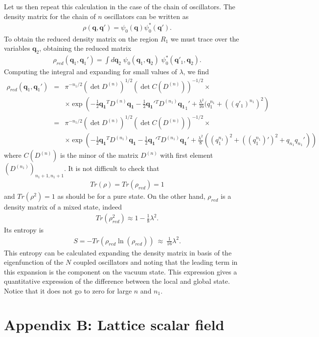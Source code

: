 \documentclass[11pt, nofootinbib]{revtex4-2}
\newcommand{\bea}{\begin{eqnarray}}
\newcommand{\eea}{\end{eqnarray}}
\begin{document}
Let us then repeat this calculation in the case of the chain of
oscillators.  The density matrix for the chain of $n$ oscillators can
be written as
%
\bea
\rho(\mathbf q, \mathbf q') = \psi_0(\mathbf q) 
\psi^*_0( \mathbf q').
\eea
%
To obtain the reduced density matrix on the region $R_{1}$ we must
trace over the variables $\mathbf q_2$, obtaining the reduced
matrix
%
\bea
{\rho}_{red}(\mathbf q_1,\mathbf q_{1}') = \int 
d\mathbf q_2\;{\psi}_0(\mathbf q_1,\mathbf q_2) 
\;{\psi}^*_0(\mathbf q'_1,\mathbf q_2). 
\eea
%
Computing the integral and expanding for small values of $\lambda$, 
we find
%
\bea
{\rho}_{red}(\mathbf q_1,\mathbf q_{1}') &=& \pi^{-n_{1}/2} \left( \det 
D^{\scriptscriptstyle{(n)}}\right)^{1/2}\left(\det 
C(D^{\scriptscriptstyle{(n)}}) \right)^{-1/2} \times \\
&& \times \exp \left( -\frac{1}{2}\mathbf{q_1}^T 
D^{\scriptscriptstyle{(n)}} \mathbf{q_1}-\frac{1}{2}\mathbf{q_1}'{}^T 
D^{\scriptscriptstyle{(n_{1})}} 
\mathbf{q_1}_1'+\frac{\lambda^2}{16}(q_1^{n_1}+((q'_1)^{n_1})^2 \right) \nonumber\\
&=&\pi^{-n_{1}/2} \left( \det D^{\scriptscriptstyle{(n)}} 
\right)^{1/2}\left(\det C( D^{\scriptscriptstyle{(n)}}) 
\right)^{-1/2} \times \nonumber\\
&& \times \exp \left( -\frac{1}{2}\mathbf{q_1}^T
D^{\scriptscriptstyle{(n_{1})}} \mathbf{q_1}-\frac{1}{2}\mathbf{q_1}'{}^T
D^{\scriptscriptstyle{(n_{1})}}\mathbf{q_1}'+\frac{\lambda^2}{8}((q_1^{n_1})^2
+((q_1^{n_1})')^
2+q_{n_1} q_{n_1}') \right) \nonumber
\eea
%
where $C(D^{\scriptscriptstyle{(n)}})$ is the minor of the matrix 
$D^{\scriptscriptstyle{(n)}}$ with first element 
$(D^{\scriptscriptstyle{(n_{1})}})_{n_{1}+1,n_{1}+1}$. It is not difficult to 
check that 
%
\bea
Tr(\rho)= 
Tr({\rho}_{red})=1
\eea
%
and $Tr(\rho^2)=1$ as should be for a pure state.  On the other hand,
${\rho}_{red}$ is a density matrix of a mixed state, indeed
%
\bea
Tr({\rho}_{red}^2) \approx 1 - \frac{1}{8}\lambda^2.
\eea
%
Its entropy  is
%
\bea
S= -Tr \left( \rho_{red} \ln (\rho_{red}) \right)  
\ \approx\ \frac{1}{16} \lambda^2.
\eea
%
This entropy can be calculated expanding the density matrix in basis
of the eigenfunction of the $N$ coupled oscillators and noting that
the leading term in this expansion is the component on the vacuum
state.  This expression gives a quantitative expression of the
difference between the local and global state.  Notice that it does
not go to zero for large $n$ and $n_{1}$.

\section*{Appendix B: Lattice scalar field}
\end{document}
